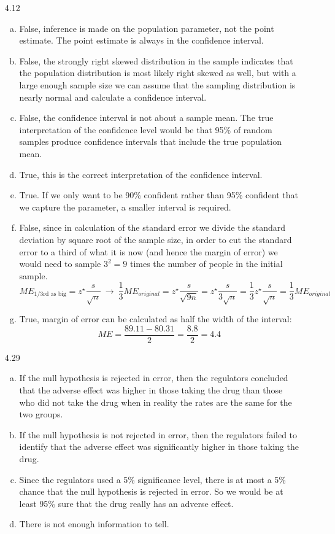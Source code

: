 \documentclass[11pt]{article}
\begin{document}
\begin{enumerate}

\item[4.12]
\begin{enumerate}[(a)]
\item False, inference is made on the population parameter, not the point estimate. The point estimate is always in the confidence interval.
\item False, the strongly right skewed distribution in the sample indicates that the population distribution is most likely right skewed as well, but with a large enough sample size we can assume that the sampling distribution is nearly normal and calculate a confidence interval.
\item False, the confidence interval is not about a sample mean. The true interpretation of the confidence level would be that 95\% of random samples produce confidence intervals that include the true population mean.
\item True, this is the correct interpretation of the confidence interval.
\item True. If we only want to be 90\% confident rather than 95\% confident that we capture the parameter, a smaller interval is required.
\item False, since in calculation of the standard error we divide the standard deviation by square root of the sample size, in order to cut the standard error to a third of what it is now (and hence the margin of error) we would need to sample $3^2 = 9$ times the number of people in the initial sample.
\[ ME_{\text{1/3rd as big}} = z^{\star} \frac{s}{\sqrt{n}} \ \rightarrow \ \frac{1}{3}ME_{original} = z^{\star} \frac{s}{\sqrt{9n}} = z^{\star} \frac{s}{3\sqrt{n}} = \frac{1}{3} z^{\star} \frac{s}{\sqrt{n}}  = \frac{1}{3} ME_{original} \]
\item True, margin of error can be calculated as half the width of the interval:
\[ ME = \frac{89.11 - 80.31}{2} = \frac{8.8}{2} = 4.4 \]
\end{enumerate}

%

\item[4.29]
\begin{enumerate}[(a)]
\item If the null hypothesis is rejected in error, then the regulators concluded that the adverse effect was higher in those taking the drug than those who did not take the drug when in reality the rates are the same for the two groups. 
\item If the null hypothesis is not rejected in error, then the regulators failed to identify that the adverse effect was significantly higher in those taking the drug.
\item Since the regulators used a 5\% significance level, there is at most a 5\% chance that the null hypothesis is rejected in error. So we would be at least 95\% sure that the drug really has an adverse effect. 
\item There is not enough information to tell.
\end{enumerate}


\end{enumerate}
\end{document}
